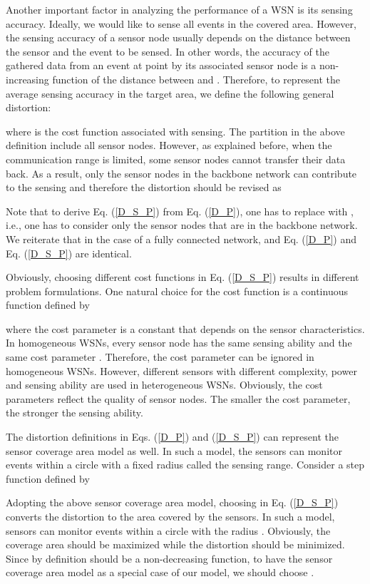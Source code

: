 \documentclass[journal,draftcls,onecolumn,12pt,twoside, narroweqnarray]{IEEEtran}
\begin{document}
Another important factor in analyzing the performance of a WSN is its sensing accuracy. Ideally, we would like to sense all events in the covered area. However, the sensing accuracy of a sensor node usually depends on the distance between the sensor and the event to be sensed.
In other words, the accuracy of the gathered data from an event at point  by its associated sensor node  is a non-increasing function of the distance between  and .
Therefore, to represent the average sensing accuracy in the target area, we define the following  general distortion:

where  is the cost function associated with sensing.
The partition  in the above definition include all sensor nodes. However, as explained before, when the communication range is limited, some sensor nodes cannot transfer their data back. As a result, only the sensor nodes in the backbone network can contribute to the sensing and therefore the distortion should be revised as

Note that to derive Eq. (\ref{D_S_P}) from Eq. (\ref{D_P}), one has to replace  with , i.e., one has to consider only the sensor nodes that are in the backbone network.
We reiterate that in the case of a fully connected network,  and Eq. (\ref{D_P}) and Eq. (\ref{D_S_P}) are identical.


Obviously, choosing different cost functions in Eq. (\ref{D_S_P}) results in different problem formulations. One natural choice for the cost function is a continuous function defined by

where the cost parameter  is a constant that depends on the sensor characteristics. In homogeneous WSNs, every sensor node has the same sensing ability and the same cost parameter . Therefore, the cost parameter can be ignored in homogeneous WSNs. However, different sensors with different complexity, power and sensing ability are used in heterogeneous WSNs. Obviously, the cost parameters  reflect the quality of sensor nodes. The smaller the cost parameter, the stronger the sensing ability.


The distortion definitions in Eqs. (\ref{D_P}) and (\ref{D_S_P}) can represent the sensor coverage area model \cite{SD} as well. In such a model, the sensors can monitor events within a circle with a fixed radius called the sensing range. Consider a step function defined by

Adopting the above sensor coverage area model, choosing  in Eq. (\ref{D_S_P}) converts the distortion to the area covered by the sensors. In such a model, sensors can monitor events within a circle with the radius . Obviously, the coverage area should be maximized while the distortion should be minimized. Since by definition  should be a non-decreasing function, to have the sensor coverage area model as a special case of our model, we should choose .
\end{document}

